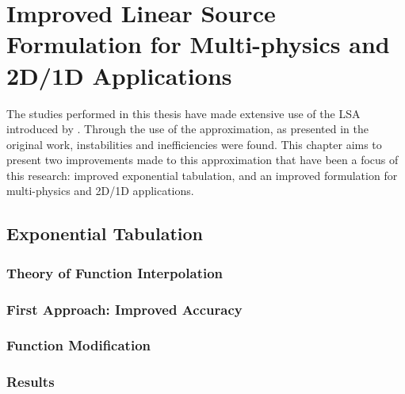 \chapter{Improved Linear Source Formulation for Multi-physics and 2D/1D Applications}{
  \label{ch:Improved Linear Source Formulation for Multi-physics and 2D/1D Applications}
  The studies performed in this thesis have made extensive use of the \acf{LSA} introduced by \citet{Ferrer2016}.
  Through the use of the approximation, as presented in the original work, instabilities and inefficiencies were found.
  This chapter aims to present two improvements made to this approximation that have been a focus of this research: improved exponential tabulation, and an improved formulation for multi-physics and 2D/1D applications.

  \section{Exponential Tabulation}{\label{sec:LSMOC:Exponential Tabulation}
    \blindtext
    \subsection{Theory of Function Interpolation}{\label{ssec:LSMOC:ET:Theory of Function Interpolation}
      \blindtext[5]
    }
    \subsection{First Approach: Improved Accuracy}{\label{ssec:LSMOC:ET:First Approach: Improved Accuracy}
      \blindtext[5]
    }
    \subsection{Function Modification}{\label{ssec:LSMOC:ET:Function Modification}
      \blindtext[5]
    }
    \subsection{Results}{\label{ssec:LSMOC:ET:Results}
      \blindtext[5]
    }
  }
}
